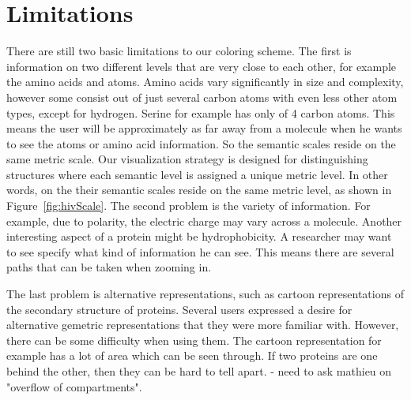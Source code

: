 \documentclass[review,journal]{vgtc}         %
\begin{document}
	
	\section{Limitations}
	There are still two basic limitations to our coloring scheme. 
	The first is information on two different levels that are very close to each other, for example the amino acids and atoms. 
	Amino acids vary significantly in size and complexity, however some consist out of just several carbon atoms with even less other atom types, except for hydrogen. 
	Serine for example has only of 4 carbon atoms. This means the user will be approximately as far away from a molecule when he wants to see the atoms or amino acid information. 
	So the semantic scales reside on the same metric scale.
	Our visualization strategy is designed for distinguishing structures where each semantic level is assigned a unique metric level.
	In other words, on the their semantic scales reside on the same metric level, as shown in Figure~\ref{fig:hivScale}.
	The second problem is the variety of information. 
	For example, due to polarity, the electric charge may vary across a molecule. 
	Another interesting aspect of a protein might be hydrophobicity.
	A researcher may want to see specify what kind of information he can see. 
	This means there are several paths that can be taken when zooming in.
	
	The last problem is alternative representations, such as cartoon representations of the secondary structure of proteins. 
	Several users expressed a desire for alternative gemetric representations that they were more familiar with.
	However, there can be some difficulty when using them. The cartoon representation for example has a lot of area which can be seen through. 
	If two proteins are one behind the other, then they can be hard to tell apart.
	- need to ask mathieu on "overflow of compartments".
	
\end{document}
